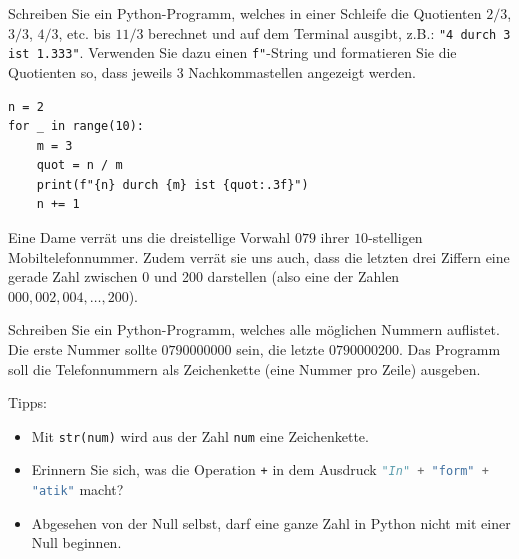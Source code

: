 \begin{myexercise}
	Schreiben Sie ein Python-Programm, welches in einer Schleife die Quotienten $2/3$, $3/3$, $4/3$, etc. bis $11/3$ berechnet und auf dem Terminal ausgibt, z.B.: \lstinline|"4 durch 3 ist 1.333"|. Verwenden Sie dazu einen \lstinline|f"|-String und formatieren Sie die Quotienten so, dass jeweils 3 Nachkommastellen angezeigt werden.
	\begin{myanswer}
		\begin{lstlisting}
n = 2
for _ in range(10):
	m = 3
	quot = n / m
	print(f"{n} durch {m} ist {quot:.3f}")
	n += 1
		\end{lstlisting}
	\end{myanswer}
\end{myexercise}

\begin{myexercise}\label{ex:str}
	Eine Dame verrät uns die dreistellige Vorwahl $079$ ihrer $10$-stelligen Mobiltelefonnummer. Zudem verrät sie uns auch, dass die letzten drei Ziffern eine gerade Zahl zwischen 0 und 200 darstellen (also eine der Zahlen $000, 002, 004, \ldots, 200$).

	Schreiben Sie ein Python-Programm, welches alle möglichen Nummern auflistet.
	Die erste Nummer sollte $0790000000$ sein, die letzte $0790000200$.
	Das Programm soll die Telefonnummern als Zeichenkette (eine Nummer pro Zeile) ausgeben.

	Tipps:
	\begin{itemize}
		\item Mit \lstinline|str(num)|
		      wird aus der Zahl \lstinline|num| eine Zeichenkette.
		\item Erinnern Sie sich, was die Operation \lstinline|+| in dem Ausdruck \lstinline[language=Python,basicstyle=\ttfamily\normalsize]!"In" + "form" + "atik"! macht?
		\item Abgesehen von der Null selbst, darf eine ganze Zahl in Python nicht mit einer Null beginnen.
	\end{itemize}
	\begin{myanswer}
		
	\end{myanswer}
\end{myexercise}

